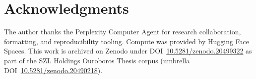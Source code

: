 \documentclass[11pt]{article}
\theoremstyle{plain}
\begin{document}
\section*{Acknowledgments}
The author thanks the Perplexity Computer Agent for research collaboration, formatting, and
reproducibility tooling. Compute was provided by Hugging Face Spaces. This work is archived on
Zenodo under DOI~\href{https://doi.org/10.5281/zenodo.20499322}{10.5281/zenodo.20499322} as part of the SZL Holdings Ouroboros Thesis
corpus (umbrella DOI~\href{https://doi.org/10.5281/zenodo.20490218}{10.5281/zenodo.20490218}).

\nocite{04ref1,04ref2,04ref3,04ref4,04ref5,04ref6,04ref7}


\end{document}
